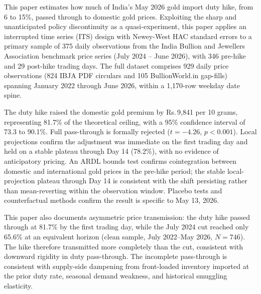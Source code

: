 This paper estimates how much of India's May 2026 gold import duty hike, from 6 to 15\%, passed through to domestic gold prices. Exploiting the sharp and unanticipated policy discontinuity as a quasi-experiment, this paper applies an interrupted time series (ITS) design with Newey-West HAC standard errors to a primary sample of 375 daily observations from the India Bullion and Jewellers Association benchmark price series (July 2024 -- June 2026), with 346 pre-hike and 29 post-hike trading days. The full dataset comprises 929 daily price observations (824 IBJA PDF circulars and 105 BullionWorld.in gap-fills) spanning January 2022 through June 2026, within a 1,170-row weekday date spine.

The duty hike raised the domestic gold premium by Rs.\,9,841 per 10 grams, representing 81.7\% of the theoretical ceiling, with a 95\% confidence interval of 73.3 to 90.1\%. Full pass-through is formally rejected ($t = -4.26$, $p < 0.001$). Local projections confirm the adjustment was immediate on the first trading day and held on a stable plateau through Day 14 (78.2\%), with no evidence of anticipatory pricing. An ARDL bounds test confirms cointegration between domestic and international gold prices in the pre-hike period; the stable local-projection plateau through Day 14 is consistent with the shift persisting rather than mean-reverting within the observation window. Placebo tests and counterfactual methods confirm the result is specific to May 13, 2026.

This paper also documents asymmetric price transmission: the duty hike passed through at 81.7\% by the first trading day, while the July 2024 cut reached only 65.6\% at an equivalent horizon (clean sample, July 2022--May 2026, $N = 746$). The hike therefore transmitted more completely than the cut, consistent with downward rigidity in duty pass-through. The incomplete pass-through is consistent with supply-side dampening from front-loaded inventory imported at the prior duty rate, seasonal demand weakness, and historical smuggling elasticity.
